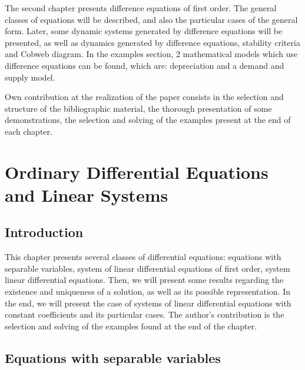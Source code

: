 \documentclass[a4paper,11pt]{report}
\begin{document}
The second chapter presents difference equations of first order. The general classes of equations will be described, and also the particular cases of the general form. Later, some dynamic systems generated by difference equations will be presented, as well as dynamics generated by difference equations, stability criteria and Cobweb diagram. In the examples section, 2 mathematical models which use difference equations can be found, which are: depreciation and a demand and supply model.\par
Own contribution at the realization of the paper consists in the selection and structure of the bibliographic material, the thorough presentation of some demonstrations, the selection and solving of the examples present at the end of each chapter.

 


 \chapter{Ordinary Differential Equations and Linear Systems}
 \section{Introduction}
 This chapter presents several classes of differential equations: equations with separable variables, system of linear differential equations of first order, system linear differential equations. Then, we will present some results regarding the existence and uniqueness of a solution, as well as its possible representation. In the end, we will present the case of systems of linear differential equations with constant coefficients and its particular cases.
 The author's contribution is the selection and solving of the examples found at the end of the chapter.
 \section{Equations with separable variables}\label{1.1.1}
\end{document}
